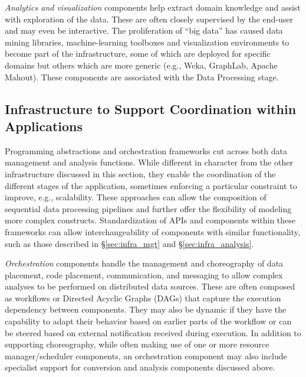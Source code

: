 {\em Analytics and visualization} components help extract domain knowledge and assist with
exploration of the data. These are often closely supervised by the end-user and may even be
interactive. The proliferation of ``big data'' has caused data mining libraries, machine-learning
toolboxes and visualization environments to become part of the infrastructure, some of which are
deployed for specific domains but others which are more generic (e.g., Weka, GraphLab, Apache Mahout). These components are associated
with the Data Processing stage.

\subsection{Infrastructure to Support Coordination within Applications}
\label{sec:infra_coord}

Programming abstractions and orchestration frameworks cut across both data
management and analysis functions. While different in character from the other
infrastructure discussed in this section, they enable the coordination of the
different stages of the application, sometimes enforcing a particular constraint to improve, e.g., scalability. These approaches can allow the composition of sequential data processing pipelines and further offer the flexibility of modeling more complex constructs.
Standardization of APIs and components within these frameworks can allow
interchangeability of components with similar functionality, such as those described in \S\ref{sec:infra_mgt} and \S\ref{sec:infra_analysis}.

{\em Orchestration} components handle the management and
choreography of data placement, code placement, communication, and
messaging to allow complex analyses to be performed on distributed
data sources. These are often composed as workflows or Directed Acyclic Graphs (DAGs) that capture
the execution dependency between
components. They may also be dynamic if they have the capability to
adapt their behavior based on earlier parts of the workflow or can be
steered based on external notification received during execution. In
addition to supporting choreography, while often making use of one or more
resource manager/scheduler components, an orchestration component may also
include specialist support for conversion and analysis components
discussed above.

